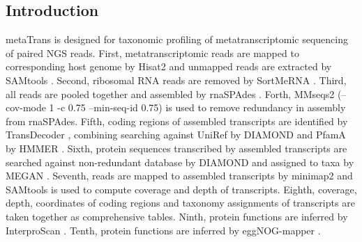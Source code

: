 \documentclass[11pt]{article}
\begin{document}
\begin{sloppypar}
\subsection{Introduction}
metaTrans is designed for taxonomic profiling of metatranscriptomic sequencing of paired NGS reads. 
First, metatranscriptomic reads are mapped to corresponding host genome by Hisat2 \parencite{kim2019graph} and unmapped reads are extracted by SAMtools \parencite{li2009sequence}. 
Second, ribosomal RNA reads are removed by SortMeRNA \parencite{kopylova2012sortmerna}. 
Third, all reads are pooled together and assembled by rnaSPAdes \parencite{bushmanova2019rnaspades}. 
Forth, MMseqs2 \parencite{steinegger2017mmseqs2} (--cov-mode 1 -c 0.75 --min-seq-id 0.75) is used to remove redundancy in assembly from rnaSPAdes. 
Fifth, coding regions of assembled transcripts are identified by TransDecoder \parencite{haas2016transdecoder}, combining searching against UniRef \parencite{suzek2007uniref} by DIAMOND \parencite{buchfink2015fast} and PfamA \parencite{mistry2021pfam} by HMMER \parencite{eddy1992hmmer}. 
Sixth, protein sequences transcribed by assembled transcripts are searched against non-redundant database by DIAMOND \parencite{buchfink2015fast} and assigned to taxa by MEGAN \parencite{huson2007megan}. 
Seventh, reads are mapped to assembled transcripts by minimap2 \parencite{li2018minimap2} and SAMtools is used to compute coverage and depth of transcripts. 
Eighth, coverage, depth, coordinates of coding regions and taxonomy assignments of transcripts are taken together as comprehensive tables. 
Ninth, protein functions are inferred by InterproScan \parencite{jones2014interproscan}. 
Tenth, protein functions are inferred by eggNOG-mapper \parencite{cantalapiedra2021eggnog}. 

\end{sloppypar}
\end{document}
